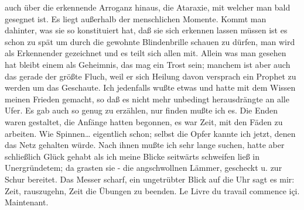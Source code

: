 \documentclass[
]{article}
\begin{document}
auch über die erkennende Arroganz hinaus, die Ataraxie, mit welcher man
bald gesegnet ist. Es liegt außerhalb der menschlichen Momente. Kommt
man dahinter, was sie so konstituiert hat, daß sie sich erkennen lassen
müssen ist es schon zu spät um durch die gewohnte Blindenbrille schauen
zu dürfen, man wird als Erkennender gezeichnet und es teilt sich allen
mit. Allein was man gesehen hat bleibt einem als Geheimnis, das mag ein
Trost sein; manchem ist aber auch das gerade der größte Fluch, weil er
sich Heilung davon versprach ein Prophet zu werden um das Geschaute. Ich
jedenfalls wußte etwas und hatte mit dem Wissen meinen Frieden gemacht,
so daß es nicht mehr unbedingt herausdrängte an alle Ufer. Es gab auch
so genug zu erzählen, nur finden mußte ich es. Die Enden waren
gestaltet, die Anfänge hatten begonnen, es war Zeit, mit den Fäden zu
arbeiten. Wie Spinnen\ldots{} eigentlich schon; selbst die Opfer kannte
ich jetzt, denen das Netz gehalten würde. Nach ihnen mußte ich sehr
lange suchen, hatte aber schließlich Glück gehabt als ich meine Blicke
seitwärts schweifen ließ in Unergründetem; da grasten sie - die
angschwollnen Lämmer, gescheckt u. zur Schur bereitet. Das Messer
scharf, ein ungetrübter Blick auf die Uhr sagt es mir: Zeit, rauszugehn,
Zeit die Übungen zu beenden. Le Livre du travail commence içi.
Maintenant.
\end{document}

